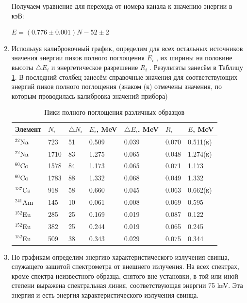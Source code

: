 \documentclass[a4paper, 12pt]{article}
\begin{document}
\begin{enumerate}
Получаем уравнение для перехода от номера канала к значению энергии в кэВ:
\begin{center}
    $E = (0.776\pm0.001)N - 52\pm2$
\end{center}

\item Используя калибровочный график, определим для всех остальных источников значения энергии пиков полного поглощения $E_i$ , их ширины на половине высоты $\triangle E_i$ и энергетическое разрешение $R_i$ . Результаты занесём в Таблицу \ref{tab:peaks}. В последний столбец занесём справочные значения для соответствующих энергий пиков полного поглощения (знаком (к) отмечены значения, по которым проводилась калибровка значений прибора)

    \begin{table}[h]
    \centering
    \caption{Пики полного поглощения различных образцов}
    \vspace{0.1cm}
    \label{tab:peaks}
    \begin{tabular}{|p{1.5cm}|p{1.5cm}|p{1.5cm}|p{1.5cm}|p{1.6cm}|p{1.5cm}|p{1.5cm}|}
\hline
  Элемент & $N_i$ & $\triangle N_i$ & $E_i$, MeV & $\triangle E_i$, MeV & $R_i$ & $E$, MeV \\
 \hline
 $^{22}$Na & 723 & 51 & 0.509 & 0.039 & 0.070 & 0.511(к) \\
 \hline
 $^{22}$Na & 1710 & 83 & 1.275 & 0.065 & 0.048 & 1.274(к) \\
\hline
 $^{60}$Co & 1578 & 84 & 1.173 & 0.065 & 0.071  & 1.173 \\
\hline
 $^{60}$Co & 1783 & 88 & 1.332 & 0.068 & 0.049 & 1.332 \\
\hline
$^{137}$Cs & 918 & 58 & 0.660 & 0.045 & 0.063 & 0.662(к) \\
\hline
$^{241}$Am & 145 & 10 & 0.061 & 0.008 & 0.069 & 0.595 \\
\hline
$^{152}$Eu & 285 & 25 & 0.169 & 0.019 & 0.087 & 0.122 \\
\hline
$^{152}$Eu & 382 & 25 & 0.244 & 0.019 & 0.065 & 0.245 \\
\hline
$^{152}$Eu & 509 & 38 & 0.343 & 0.029 & 0.075 & 0.344 \\
\hline
 \end{tabular}
\end{table} 

\item По графикам определим энергию характеристического излучения свинца, служащего защитой спектрометра от внешнего излучения. На всех спектрах, кроме спектра неизвестного образца, снятого вне установки, в той или иной степени выражена спектральная линия, соответствующая энергии 75 keV. Эта энергия и есть энергия характеристического излучения свинца.



\end{enumerate}
\end{document}
